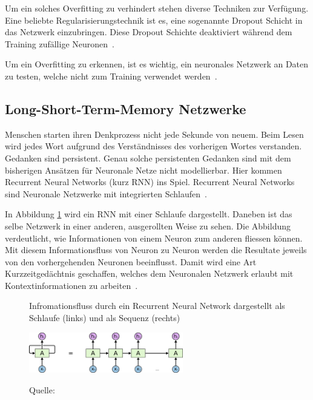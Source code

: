 Um ein solches Overfitting zu verhindert stehen diverse Techniken zur Verfügung. Eine beliebte Regularisierungstechnik ist es, eine sogenannte Dropout Schicht in das Netzwerk einzubringen. Diese Dropout Schichte deaktiviert während dem Training zufällige Neuronen~\autocite{Krogh2008, TODO_Dropout}.  

Um ein Overfitting zu erkennen, ist es wichtig, ein neuronales Netzwerk an Daten zu testen, welche nicht zum Training verwendet werden~\autocite{Krogh2008}. 

\subsection{Long-Short-Term-Memory Netzwerke}

Menschen starten ihren Denkprozess nicht jede Sekunde von neuem. Beim Lesen wird jedes Wort aufgrund des Verständnisses des vorherigen Wortes verstanden. Gedanken sind persistent. Genau solche persistenten Gedanken sind mit dem bisherigen Ansätzen für Neuronale Netze nicht modellierbar. Hier kommen Recurrent Neural Networks (kurz RNN) ins Spiel. Recurrent Neural Networks sind Neuronale Netzwerke mit integrierten Schlaufen~\autocite{Olah2015}. 

In Abbildung \ref{rnn1} wird ein RNN mit einer Schlaufe dargestellt. Daneben ist das selbe Netzwerk in einer anderen, ausgerollten Weise zu sehen. Die Abbildung verdeutlicht, wie Informationen von einem Neuron zum anderen fliessen können. Mit diesem Informationsfluss von Neuron zu Neuron werden die Resultate jeweils von den vorhergehenden Neuronen beeinflusst. Damit wird eine Art Kurzzeitgedächtnis geschaffen, welches dem Neuronalen Netzwerk erlaubt mit Kontextinformationen zu arbeiten~\autocite{Olah2015}.
\begin{figure}[h]
    \captionsetup{width=.8\linewidth}
    \caption{Infromationsfluss durch ein Recurrent Neural Network dargestellt als Schlaufe (links) und als Sequenz (rechts)}
    \label{rnn1}
    \centering
    \vspace{0.2cm}
    \includegraphics[width=0.6\textwidth]{graphics/rnn1.png}\\
    \vspace{0.3cm}
    \caption*{Quelle: \textcite{Olah2015}}
\end{figure}

